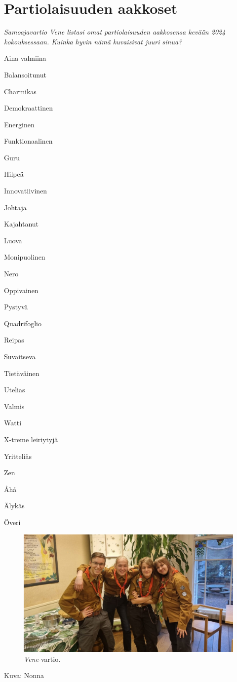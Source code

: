 \section{Partiolaisuuden aakkoset}

\textit{Samoajavartio Vene listasi omat partiolaisuuden aakkosensa kevään 
2024 kokouksessaan. Kuinka hyvin nämä kuvaisivat juuri sinua?}

\begin{multicols}{3}
\setlength{\parindent}{0em}\setlength{\parskip}{.5em} {\large A}ina valmiina

{\large B}alansoitunut

{\large C}harmikas

{\large D}emokraattinen

{\large E}nerginen

{\large F}unktionaalinen

{\large G}uru

{\large H}ilpeä

{\large I}nnovatiivinen

{\large J}ohtaja

{\large K}ajahtanut

{\large L}uova

{\large M}onipuolinen

{\large N}ero

{\large O}ppivainen

{\large P}ystyvä

{\large Q}uadrifoglio

{\large R}eipas

{\large S}uvaitseva

{\large T}ietäväinen

{\large U}telias

{\large V}almis

{\large W}atti

{\large X}-treme leiriytyjä

{\large Y}ritteliäs

{\large Z}en

{\large Å}hå

{\large Ä}lykäs

{\large Ö}veri
\end{multicols}

\begin{figure}[!h]
\centering\includegraphics[width=\textwidth]{assets/vene}
\caption{\textit{Vene}-vartio.}
\end{figure}

\medskip

\noindent\null\hfill Kuva: Nonna
